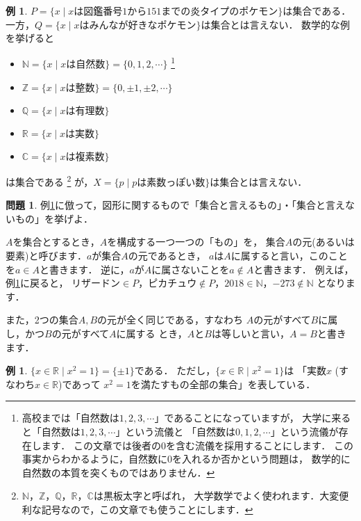 ﻿\documentclass[./main]{subfiles} %
\theoremstyle{definition}
\newtheorem{hamadaex}[hamadadefi]{例}
\newtheorem{hamadaqst}[hamadadefi]{問題}
\begin{document}
\begin{hamadaex}
\label{shugo}
$P=\{x\mid xは図鑑番号1から151までの炎タイプのポケモン\}$は集合である．
一方，$Q=\{x\mid xはみんなが好きなポケモン\}$は集合とは言えない．
数学的な例を挙げると
\begin{itemize}
\item $\mathbb{N}=\{x\mid xは自然数\}=\{0,1,2,\cdots\}$
\footnote{高校までは「自然数は$1,2,3,\cdots$」であることになっていますが，
大学に来ると「自然数は$1,2,3,\cdots$」という流儀と
「自然数は$0,1,2,\cdots$」という流儀が存在します．
この文章では後者の0を含む流儀を採用することにします．
この事実からわかるように，自然数に0を入れるか否かという問題は，
数学的に自然数の本質を突くものではありません．}
\item $\mathbb{Z}=\{x\mid xは整数\}=\{0,\pm1,\pm2,\cdots\}$
\item $\mathbb{Q}=\{x\mid xは有理数\}$
\item $\mathbb{R}=\{x\mid xは実数\}$
\item $\mathbb{C}=\{x\mid xは複素数\}$
\end{itemize}
は集合である
\footnote{$\mathbb{N}$，$\mathbb{Z}$，$\mathbb{Q}$，$\mathbb{R}$，$\mathbb{C}$は黒板太字と呼ばれ，
大学数学でよく使われます．大変便利な記号なので，この文章でも使うことにします．}
が，$X=\{p\mid pは素数っぽい数\}$は集合とは言えない．
\end{hamadaex}

\begin{hamadaqst}
\label{shugoq}
例\ref{shugo}に倣って，図形に関するもので「集合と言えるもの」・「集合と言えないもの」を挙げよ．
\end{hamadaqst}

$A$を集合とするとき，$A$を構成する一つ一つの「もの」を，
集合$A$の元(あるいは要素)と呼びます．$a$が集合$A$の元であるとき，
$a$は$A$に属すると言い，このことを$a\in A$と書きます．
逆に，$a$が$A$に属さないことを$a\notin A$と書きます．
例えば，例\ref{shugo}に戻ると，
$リザードン\in P$，$ピカチュウ\notin P$，$2018\in\mathbb{N}$，$-273\notin\mathbb{N}$
となります．

また，2つの集合$A,B$の元が全く同じである，すなわち
$A$の元がすべて$B$に属し，かつ$B$の元がすべて$A$に属する
とき，$A$と$B$は等しいと言い，$A=B$と書きます．

\begin{hamadaex}
$\{x\in\mathbb{R}\mid x^2=1\}=\{\pm1\}$である．
ただし，$\{x\in\mathbb{R}\mid x^2=1\}$は
「実数$x$ (すなわち$x\in\mathbb{R}$)であって
$x^2=1$を満たすもの全部の集合」を表している．
\end{hamadaex}
\end{document}
